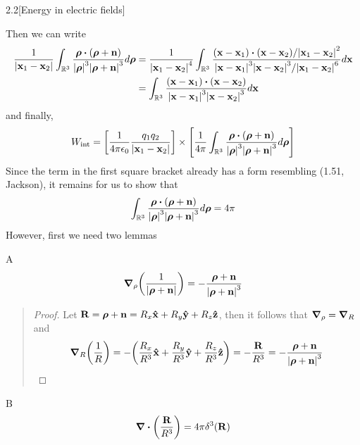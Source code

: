\documentclass[12pt]{article}
\begin{document}
\begin{problem}{2.2}[Energy in electric fields]
\begin{solution}
Then we can write
\begin{align}
    \frac1{\abs{\vb{x}_1-\vb{x}_2}}\int_{\R^3} 
    \frac{\bm\rho\vdot(\bm\rho+\vb{n})}{\abs{\bm\rho}^3\abs{\bm\rho+\vb{n}}^3} d\bm\rho
    &=\frac1{\abs{\vb{x}_1-\vb{x}_2}^4}\int_{\R^3} 
    \frac{\qty(\vb{x}-\vb{x}_1)\vdot\qty(\vb{x}-\vb{x}_2)/\abs{\vb{x}_1-\vb{x}_2}^2}
    {\abs{\vb{x}-\vb{x}_1}^3\abs{\vb{x}-\vb{x}_2}^3/\abs{\vb{x}_1-\vb{x}_2}^6}d\vb{x}\notag\\
    &=\int_{\R^3}
        \frac{\qty(\vb{x}-\vb{x}_1)\vdot\qty(\vb{x}-\vb{x}_2)}{\abs{\vb{x}-\vb{x}_1}^3\abs{\vb{x}-\vb{x}_2}^3} d\vb{x}
\end{align}
and finally,
\begin{equation}\label{p2b:wint}
    W_{\text{int}}
    =\qty[\frac1{4\pi\epsilon_0}\frac{q_1q_2}{\abs{\vb{x}_1-\vb{x}_2}}]
    \times\qty[\frac1{4\pi}\int_{\R^3}\frac{\bm\rho\vdot(\bm\rho+\vb{n})}
        {\abs{\bm\rho}^3\abs{\bm\rho+\vb{n}}^3}d\bm\rho
    ]
\end{equation}
Since the term in the first square bracket already has a form resembling (1.51,
Jackson), it remains for us to show that
\begin{equation}\label{p2b:wts}
    \int_{\R^3} \frac{\bm\rho\vdot(\bm\rho+\vb{n})}
        {\abs{\bm\rho}^3\abs{\bm\rho+\vb{n}}^3}d\bm\rho=4\pi
\end{equation}
However, first we need two lemmas
\begin{lemma}{A}
    \begin{equation}\label{lA}
        \grad_\rho\qty(\frac1{\abs{\bm\rho+\vb{n}}})=-\frac{\bm\rho+\vb{n}}{\abs{\bm\rho+\vb{n}}^3} 
    \end{equation} 
\end{lemma}
\begin{quote}
\begin{proof}
    Let $\vb{R}=\bm\rho+\vb{n}=R_x\vb{\hat{x}}+R_y\vb{\hat{y}}+R_z\vb{\hat{z}}$, then it follows 
    that $\grad_\rho=\grad_R$ and
    \begin{align*}
        \grad_R\qty(\frac1R)
        =-\qty(\frac{R_x}{R^3}\vb{\hat{x}}+\frac{R_y}{R^3}\vb{\hat{y}}+\frac{R_z}{R^3}\vb{\hat{z}})
        =-\frac{\vb{R}}{R^3}
        =-\frac{\bm\rho+\vb{n}}{\abs{\bm\rho+\vb{n}}^3}
    \end{align*}
\end{proof}   
\end{quote}
\begin{lemma}{B}
    \begin{equation}\label{lB}
    \div{\qty(\frac{\vb{R}}{R^3})}=4\pi\delta^3(\vb{R}) 
\end{equation} 

\end{lemma}
\end{solution}
\end{problem}
\end{document}
